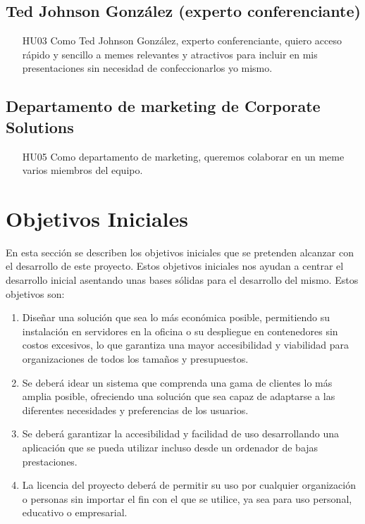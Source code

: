     \subsection{Ted Johnson González (experto conferenciante)}

        \begin{enumerate}
            \item [HU03] Como Ted Johnson González, experto conferenciante, quiero acceso rápido y sencillo a memes relevantes y atractivos para incluir en mis presentaciones sin necesidad de confeccionarlos yo mismo.
        \end{enumerate}

    \subsection{Departamento de marketing de Corporate Solutions}

        \begin{enumerate}
            \item [HU05] Como departamento de marketing, queremos colaborar en un meme varios miembros del equipo.
        \end{enumerate}

\section{Objetivos Iniciales}

En esta sección se describen los objetivos iniciales que se pretenden alcanzar con el desarrollo de este proyecto. Estos objetivos iniciales nos ayudan a centrar el desarrollo inicial asentando unas bases sólidas para el desarrollo del mismo. Estos objetivos son:

\begin{enumerate}
    \item Diseñar una solución que sea lo más económica posible, permitiendo su instalación en servidores en la oficina o su despliegue en contenedores sin costos excesivos, lo que garantiza una mayor accesibilidad y viabilidad para organizaciones de todos los tamaños y presupuestos.
    \item Se deberá idear un sistema que comprenda una gama de clientes lo más amplia posible, ofreciendo una solución que sea capaz de adaptarse a las diferentes necesidades y preferencias de los usuarios.
    \item Se deberá garantizar la accesibilidad y facilidad de uso desarrollando una aplicación que se pueda utilizar incluso desde un ordenador de bajas prestaciones.
    \item La licencia del proyecto deberá de permitir su uso por cualquier organización o personas sin importar el fin con el que se utilice, ya sea para uso personal, educativo o empresarial.
\end{enumerate}